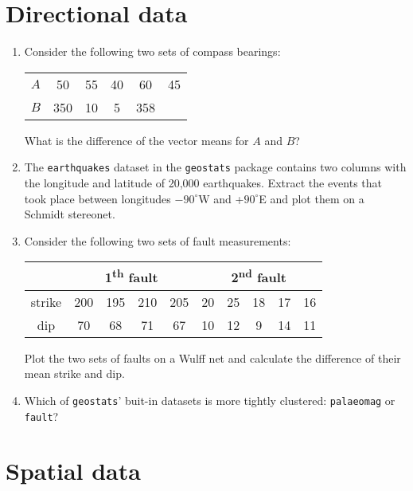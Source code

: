 \section{Directional data}
\label{sec:ex-directional}

\begin{enumerate}

\item Consider the following two sets of compass bearings:

  \begin{tabular}{c|ccccc}
    $A$ & 50 & 55 & 40 & 60 & 45 \\
    $B$ & 350 & 10 & 5 & 358 & 
  \end{tabular}

  What is the difference of the vector means for $A$ and $B$?

\item The \texttt{earthquakes} dataset in the \texttt{geostats}
  package contains two columns with the longitude and latitude of
  20,000 earthquakes.  Extract the events that took place between
  longitudes $-90^\circ$W and +$90^\circ$E and plot them on a Schmidt
  stereonet.

\item Consider the following two sets of fault measurements:

  \begin{tabular}{c|cccc|ccccc}
    ~ & \multicolumn{4}{c|}{1\textsuperscript{th} fault} &
        \multicolumn{5}{c}{2\textsuperscript{nd} fault} \\ \hline
    strike & 200 & 195 & 210 & 205 & 20 & 25 & 18 & 17 & 16 \\
    dip    & 70  & 68  & 71  & 67 & 10 & 12 & 9  & 14 & 11 \\
  \end{tabular}

  Plot the two sets of faults on a Wulff net and calculate the
  difference of their mean strike and dip.

\item Which of \texttt{geostats}' buit-in datasets is more tightly
  clustered: \texttt{palaeomag} or \texttt{fault}?
  
\end{enumerate}

\section{Spatial data}
\label{sec:ex-spatial}

